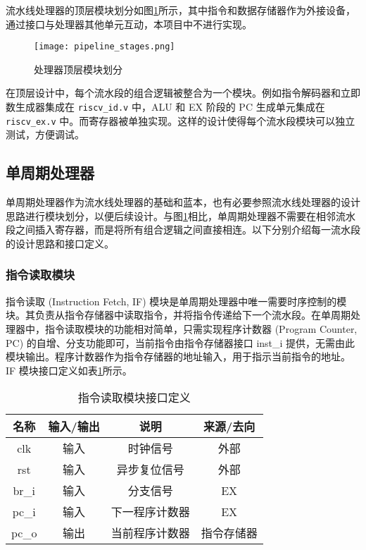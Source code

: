 \documentclass[lang=zh]{sjtuarticle}	%
\begin{document}
流水线处理器的顶层模块划分如图\ref{fig:pipeline_stages}所示\cite{COD}，其中指令和数据存储器作为外接设备，通过接口与处理器其他单元互动，本项目中不进行实现。

\begin{figure}[!htp]
	\centering
	\texttt{[image: pipeline\_stages.png]}
	\caption{处理器顶层模块划分}
	\label{fig:pipeline_stages}
\end{figure}

在顶层设计中，每个流水段的组合逻辑被整合为一个模块。例如指令解码器和立即数生成器集成在 \texttt{riscv\_id.v} 中，ALU 和 EX 阶段的 PC 生成单元集成在 \texttt{riscv\_ex.v} 中。而寄存器被单独实现。这样的设计使得每个流水段模块可以独立测试，方便调试。

\subsection{单周期处理器}

单周期处理器作为流水线处理器的基础和蓝本，也有必要参照流水线处理器的设计思路进行模块划分，以便后续设计。与图\ref{fig:pipeline_stages}相比，单周期处理器不需要在相邻流水段之间插入寄存器，而是将所有组合逻辑之间直接相连。以下分别介绍每一流水段的设计思路和接口定义。

\subsubsection{指令读取模块}

指令读取 (Instruction Fetch, IF) 模块是单周期处理器中唯一需要时序控制的模块。其负责从指令存储器中读取指令，并将指令传递给下一个流水段。在单周期处理器中，指令读取模块的功能相对简单，只需实现程序计数器 (Program Counter, PC) 的自增、分支功能即可，当前指令由指令存储器接口 inst\_i 提供，无需由此模块输出。程序计数器作为指令存储器的地址输入，用于指示当前指令的地址。IF 模块接口定义如表\ref{tab:single_if_io}所示。

\begin{table}[!htp]
	\centering
	\caption{指令读取模块接口定义}
	\label{tab:single_if_io}
	\begin{tabular}{|c|c|c|c|}
		\hline
		名称 & 输入/输出 & 说明 & 来源/去向 \\
		\hline
		clk & 输入 & 时钟信号 & 外部 \\
		\hline
		rst & 输入 & 异步复位信号 & 外部 \\
		\hline
		br\_i & 输入 & 分支信号 & EX \\
		\hline
		pc\_i & 输入 & 下一程序计数器 & EX \\
		\hline
		pc\_o & 输出 & 当前程序计数器 & 指令存储器 \\
		\hline
	\end{tabular}
\end{table}
\end{document}
